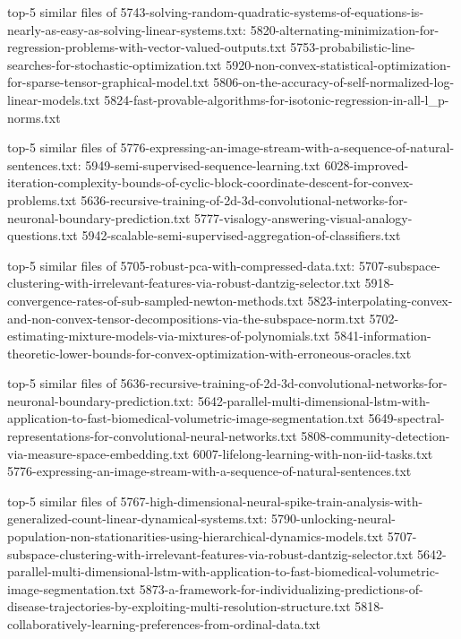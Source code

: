\documentclass[11pt]{article}
\begin{document}
top-5 similar files of
5743-solving-random-quadratic-systems-of-equations-is-nearly-as-easy-as-solving-linear-systems.txt:
5820-alternating-minimization-for-regression-problems-with-vector-valued-outputs.txt
5753-probabilistic-line-searches-for-stochastic-optimization.txt
5920-non-convex-statistical-optimization-for-sparse-tensor-graphical-model.txt
5806-on-the-accuracy-of-self-normalized-log-linear-models.txt
5824-fast-provable-algorithms-for-isotonic-regression-in-all-l\_p-norms.txt

top-5 similar files of
5776-expressing-an-image-stream-with-a-sequence-of-natural-sentences.txt:
5949-semi-supervised-sequence-learning.txt
6028-improved-iteration-complexity-bounds-of-cyclic-block-coordinate-descent-for-convex-problems.txt
5636-recursive-training-of-2d-3d-convolutional-networks-for-neuronal-boundary-prediction.txt
5777-visalogy-answering-visual-analogy-questions.txt
5942-scalable-semi-supervised-aggregation-of-classifiers.txt

top-5 similar files of 5705-robust-pca-with-compressed-data.txt:
5707-subspace-clustering-with-irrelevant-features-via-robust-dantzig-selector.txt
5918-convergence-rates-of-sub-sampled-newton-methods.txt
5823-interpolating-convex-and-non-convex-tensor-decompositions-via-the-subspace-norm.txt
5702-estimating-mixture-models-via-mixtures-of-polynomials.txt
5841-information-theoretic-lower-bounds-for-convex-optimization-with-erroneous-oracles.txt

top-5 similar files of
5636-recursive-training-of-2d-3d-convolutional-networks-for-neuronal-boundary-prediction.txt:
5642-parallel-multi-dimensional-lstm-with-application-to-fast-biomedical-volumetric-image-segmentation.txt
5649-spectral-representations-for-convolutional-neural-networks.txt
5808-community-detection-via-measure-space-embedding.txt
6007-lifelong-learning-with-non-iid-tasks.txt
5776-expressing-an-image-stream-with-a-sequence-of-natural-sentences.txt

top-5 similar files of
5767-high-dimensional-neural-spike-train-analysis-with-generalized-count-linear-dynamical-systems.txt:
5790-unlocking-neural-population-non-stationarities-using-hierarchical-dynamics-models.txt
5707-subspace-clustering-with-irrelevant-features-via-robust-dantzig-selector.txt
5642-parallel-multi-dimensional-lstm-with-application-to-fast-biomedical-volumetric-image-segmentation.txt
5873-a-framework-for-individualizing-predictions-of-disease-trajectories-by-exploiting-multi-resolution-structure.txt
5818-collaboratively-learning-preferences-from-ordinal-data.txt
\end{document}
